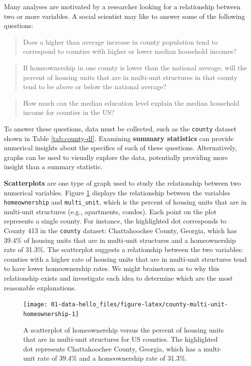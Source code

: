 \documentclass[
  10pt,
  openany]{book}
\begin{document}
Many analyses are motivated by a researcher looking for a relationship between two or more variables.
A social scientist may like to answer some of the following questions:

\begin{quote}
Does a higher than average increase in county population tend to correspond to counties with higher or lower median household incomes?
\end{quote}

\begin{quote}
If homeownership in one county is lower than the national average, will the percent of housing units that are in multi-unit structures in that county tend to be above or below the national average?
\end{quote}

\begin{quote}
How much can the median education level explain the median household income for counties in the US?
\end{quote}

To answer these questions, data must be collected, such as the \texttt{county} dataset shown in Table \ref{tab:county-df}.
Examining \textbf{summary statistics} can provide numerical insights about the specifics of each of these questions.
Alternatively, graphs can be used to visually explore the data, potentially providing more insight than a summary statistic.

\textbf{Scatterplots} are one type of graph used to study the relationship between two numerical variables.
Figure \ref{fig:county-multi-unit-homeownership} displays the relationship between the variables \texttt{homeownership} and \texttt{multi\_unit}, which is the percent of housing units that are in multi-unit structures (e.g., apartments, condos).
Each point on the plot represents a single county.
For instance, the highlighted dot corresponds to County 413 in the \texttt{county} dataset: Chattahoochee County, Georgia, which has 39.4\% of housing units that are in multi-unit structures and a homeownership rate of 31.3\%.
The scatterplot suggests a relationship between the two variables: counties with a higher rate of housing units that are in multi-unit structures tend to have lower homeownership rates.
We might brainstorm as to why this relationship exists and investigate each idea to determine which are the most reasonable explanations.

\begin{figure}[h]

{\centering \texttt{[image: 01-data-hello\_files/figure-latex/county-multi-unit-homeownership-1]} 

}

\caption{A scatterplot of homeownership versus the percent of housing units that are in multi-unit structures for US counties. The highlighted dot represents Chattahoochee County, Georgia, which has a multi-unit rate of 39.4\% and a homeownership rate of 31.3\%.}\label{fig:county-multi-unit-homeownership}
\end{figure}
\end{document}
